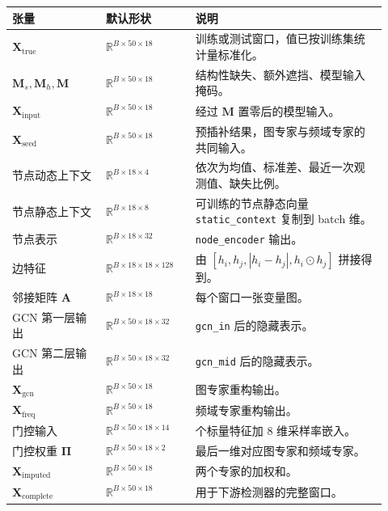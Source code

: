 \documentclass[UTF8]{ctexart}
\begin{document}
{\small
\begin{longtable}{@{}>{\raggedright\arraybackslash}p{0.23\linewidth} >{\raggedright\arraybackslash}p{0.22\linewidth} >{\raggedright\arraybackslash}p{0.47\linewidth}@{}}
\toprule
张量 & 默认形状 & 说明 \\
\midrule
\endhead
\(\bm{X}_{\text{true}}\) & \(\mathbb{R}^{B \times 50 \times 18}\) & 训练或测试窗口，值已按训练集统计量标准化。 \\
\(\bm{M}_{s},\bm{M}_{h},\bm{M}\) & \(\mathbb{R}^{B \times 50 \times 18}\) & 结构性缺失、额外遮挡、模型输入掩码。 \\
\(\bm{X}_{\text{input}}\) & \(\mathbb{R}^{B \times 50 \times 18}\) & 经过 \(\bm{M}\) 置零后的模型输入。 \\
\(\bm{X}_{\text{seed}}\) & \(\mathbb{R}^{B \times 50 \times 18}\) & 预插补结果，图专家与频域专家的共同输入。 \\
节点动态上下文 & \(\mathbb{R}^{B \times 18 \times 4}\) & 依次为均值、标准差、最近一次观测值、缺失比例。 \\
节点静态上下文 & \(\mathbb{R}^{B \times 18 \times 8}\) & 可训练的节点静态向量 \texttt{static\_context} 复制到 batch 维。 \\
节点表示 & \(\mathbb{R}^{B \times 18 \times 32}\) & \texttt{node\_encoder} 输出。 \\
边特征 & \(\mathbb{R}^{B \times 18 \times 18 \times 128}\) & 由 \([h_i,h_j,|h_i-h_j|,h_i \odot h_j]\) 拼接得到。 \\
邻接矩阵 \(\bm{A}\) & \(\mathbb{R}^{B \times 18 \times 18}\) & 每个窗口一张变量图。 \\
GCN 第一层输出 & \(\mathbb{R}^{B \times 50 \times 18 \times 32}\) & \texttt{gcn\_in} 后的隐藏表示。 \\
GCN 第二层输出 & \(\mathbb{R}^{B \times 50 \times 18 \times 32}\) & \texttt{gcn\_mid} 后的隐藏表示。 \\
\(\bm{X}_{\text{gcn}}\) & \(\mathbb{R}^{B \times 50 \times 18}\) & 图专家重构输出。 \\
\(\bm{X}_{\text{freq}}\) & \(\mathbb{R}^{B \times 50 \times 18}\) & 频域专家重构输出。 \\
门控输入 & \(\mathbb{R}^{B \times 50 \times 18 \times 14}\) & 6 个标量特征加 8 维采样率嵌入。 \\
门控权重 \(\bm{\Pi}\) & \(\mathbb{R}^{B \times 50 \times 18 \times 2}\) & 最后一维对应图专家和频域专家。 \\
\(\bm{X}_{\text{imputed}}\) & \(\mathbb{R}^{B \times 50 \times 18}\) & 两个专家的加权和。 \\
\(\bm{X}_{\text{complete}}\) & \(\mathbb{R}^{B \times 50 \times 18}\) & 用于下游检测器的完整窗口。 \\
\bottomrule
\end{longtable}
}
\end{document}
